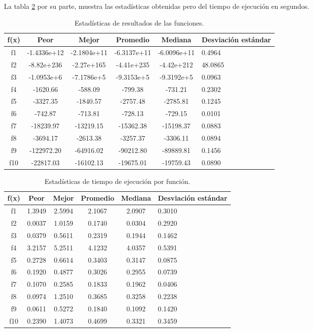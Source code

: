 \documentclass[12pt,twoside]{article}
\begin{document}
La tabla \ref{tab:tiempo} por su parte, muestra las estadísticas obtenidas pero del tiempo de ejecución en segundos. 

\begin{table}[h]
	\centering
	\begin{tabular}{|c|c|c|c|c|p{2.1cm}|}  
		\hline
		\textbf{f(x)} & \textbf{Peor} & \textbf{Mejor} & \textbf{Promedio} & \textbf{Mediana} & \textbf{Desviación estándar} \\  
		\hline
		f1  & -1.4336e+12 & -2.1804e+11 & -6.3137e+11 & -6.0096e+11 & 0.4964 \\
		f2  & -8.82e+236  & -2.27e+165  & -4.41e+235  & -4.42e+212  & 48.0865 \\
		f3  & -1.0953e+6  & -7.1786e+5  & -9.3153e+5  & -9.3192e+5  & 0.0963 \\
		f4  & -1620.66     & -588.09     & -799.38     & -731.21     & 0.2302 \\
		f5  & -3327.35     & -1840.57    & -2757.48    & -2785.81    & 0.1245 \\
		f6  & -742.87      & -713.81     & -728.13     & -729.15     & 0.0101 \\
		f7  & -18239.97    & -13219.15   & -15362.38   & -15198.37   & 0.0883 \\
		f8  & -3694.17     & -2613.38    & -3257.37    & -3306.11    & 0.0894 \\
		f9  & -122972.20   & -64916.02   & -90212.80   & -89889.81   & 0.1456 \\
		f10 & -22817.03    & -16102.13   & -19675.01   & -19759.43   & 0.0890 \\
		\hline
	\end{tabular}
	\caption{Estadísticas de resultados de las funciones.}
	\label{tab:res}
\end{table}


\begin{table}[h]
	\centering
	\begin{tabular}{|c|c|c|c|c|p{2.1cm}|}  
		\hline
		\textbf{f(x)} & \textbf{Peor} & \textbf{Mejor} & \textbf{Promedio} & \textbf{Mediana} & \textbf{Desviación estándar} \\  
		\hline
		f1 & 1.3949 & 2.5994 & 2.1067 & 2.0907 & 0.3010 \\
		f2 & 0.0037 & 1.0159 & 0.1740 & 0.0304 & 0.2920 \\
		f3 & 0.0379 & 0.5611 & 0.2319 & 0.1944 & 0.1462 \\
		f4 & 3.2157 & 5.2511 & 4.1232 & 4.0357 & 0.5391 \\
		f5 & 0.2728 & 0.6614 & 0.3403 & 0.3147 & 0.0875 \\
		f6 & 0.1920 & 0.4877 & 0.3026 & 0.2955 & 0.0739 \\
		f7 & 0.1070 & 0.2585 & 0.1833 & 0.1962 & 0.0406 \\
		f8 & 0.0974 & 1.2510 & 0.3685 & 0.3258 & 0.2238 \\
		f9 & 0.0611 & 0.5272 & 0.1840 & 0.1092 & 0.1420 \\
		f10 & 0.2390 & 1.4073 & 0.4699 & 0.3321 & 0.3459 \\
		\hline
	\end{tabular}
	\caption{Estadísticas de tiempo de ejecución por función.}
	\label{tab:tiempo}
\end{table}


	\clearpage
	
	
\end{document}
